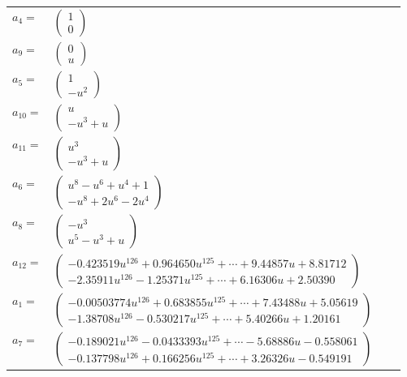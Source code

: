 \documentclass[1p]{elsarticle_modified}
\theoremstyle{definition}
\begin{document}
\begin{tabular}{m{7pt} m{180pt} m{7pt} m{180pt} }
\flushright $a_{4}=$&$\begin{pmatrix}1\\0\end{pmatrix}$ \\
\flushright $a_{9}=$&$\begin{pmatrix}0\\u\end{pmatrix}$ \\
\flushright $a_{5}=$&$\begin{pmatrix}1\\- u^2\end{pmatrix}$ \\
\flushright $a_{10}=$&$\begin{pmatrix}u\\- u^3+u\end{pmatrix}$ \\
\flushright $a_{11}=$&$\begin{pmatrix}u^3\\- u^3+u\end{pmatrix}$ \\
\flushright $a_{6}=$&$\begin{pmatrix}u^8- u^6+u^4+1\\- u^8+2 u^6-2 u^4\end{pmatrix}$ \\
\flushright $a_{8}=$&$\begin{pmatrix}- u^3\\u^5- u^3+u\end{pmatrix}$ \\
\flushright $a_{12}=$&$\begin{pmatrix}-0.423519 u^{126}+0.964650 u^{125}+\cdots+9.44857 u+8.81712\\-2.35911 u^{126}-1.25371 u^{125}+\cdots+6.16306 u+2.50390\end{pmatrix}$ \\
\flushright $a_{1}=$&$\begin{pmatrix}-0.00503774 u^{126}+0.683855 u^{125}+\cdots+7.43488 u+5.05619\\-1.38708 u^{126}-0.530217 u^{125}+\cdots+5.40266 u+1.20161\end{pmatrix}$ \\
\flushright $a_{7}=$&$\begin{pmatrix}-0.189021 u^{126}-0.0433393 u^{125}+\cdots-5.68886 u-0.558061\\-0.137798 u^{126}+0.166256 u^{125}+\cdots+3.26326 u-0.549191\end{pmatrix}$ \\

\end{tabular}
\end{document}
